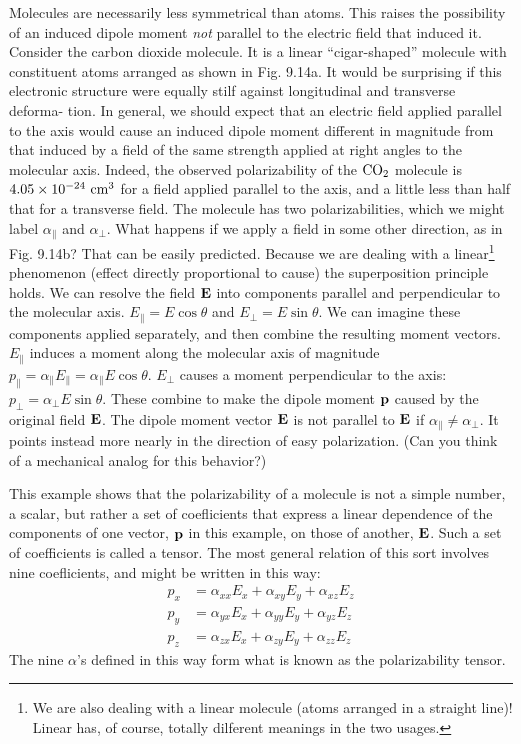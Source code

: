 Molecules are necessarily less symmetrical than atoms. This raises
the possibility of an induced dipole moment \emph{not} parallel to the electric
field that induced it. Consider the carbon dioxide molecule. It is
a linear ``cigar-shaped'' molecule with constituent atoms arranged
as shown in Fig. 9.14a. It would be surprising if this electronic structure
were equally stilf against longitudinal and transverse deforma-
tion. In general, we should expect that an electric field applied
parallel to the axis would cause an induced dipole moment different
in magnitude from that induced by a field of the same strength applied
at right angles to the molecular axis. Indeed, the observed
polarizability of the $\textup{CO}_2$ molecule is $4.05 \times 10^{-24}\ \textup{cm}^3$ for a field
applied parallel to the axis, and a little less than half that for a transverse
field. The molecule has two polarizabilities, which we might
label $\alpha_\parallel$ and $\alpha_\perp$. What happens if we apply a field in some other
direction, as in Fig. 9.14b? That can be easily predicted. Because
we are dealing with a linear\footnote{We
are also dealing with a linear molecule (atoms arranged in a straight line)!
Linear has, of course, totally dilferent meanings in the two usages.}
phenomenon (effect directly proportional
to cause) the superposition principle holds. We can resolve
the field $\mathbf{E}$ into components parallel and perpendicular to the molecular
axis. $E_\parallel = E \cos \theta$ and $E_\perp = E \sin \theta$. We can imagine these
components applied separately, and then combine the resulting
moment vectors. $E_\parallel$ induces a moment along the molecular axis of
magnitude $p_\parallel = \alpha_\parallel E_\parallel = \alpha_\parallel E \cos \theta$.
$E_\perp$ causes a moment perpendicular
to the axis: $p_\perp = \alpha_\perp E \sin \theta$. These combine to make the dipole
moment $\mathbf{p}$ caused by the original field $\mathbf{E}$. The dipole moment
vector $\mathbf{E}$ is not parallel to $\mathbf{E}$ if $\alpha_\parallel\ne \alpha_\perp$. It points instead more nearly
in the direction of easy polarization. (Can you think of a mechanical
analog for this behavior?)

This example shows that the polarizability of a molecule is not a
simple number, a scalar, but rather a set of coeflicients that express
a linear dependence of the components of one vector, $\mathbf{p}$ in this 
example, on those of another, $\mathbf{E}$. Such a set of coefficients is called a
tensor. The most general relation of this sort involves
nine coeflicients, and might be written in this way:
\begin{align}
  p_x &= \alpha_{xx}E_x+\alpha_{xy}E_y+\alpha_{xz}E_z \\
  p_y &= \alpha_{yx}E_x+\alpha_{yy}E_y+\alpha_{yz}E_z \\
  p_z &= \alpha_{zx}E_x+\alpha_{zy}E_y+\alpha_{zz}E_z 
\end{align}
The nine $\alpha$'s defined in this way form what is known as the 
polarizability tensor.


